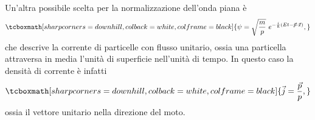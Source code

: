 \documentclass[a4paper,12pt,oneside]{book}
\begin{document}
Un'altra possibile scelta per la normalizzazione dell'onda piana è
	\begin{equation}
		\tcboxmath[sharp corners=downhill, colback=white, colframe=black]{	
			\psi  = \sqrt{\frac{m}{p}}\ e^{-\frac{i}{\hbar} (Et - \vec{p}\cdot \vec{x})},
			}
	\end{equation}
che descrive la corrente di particelle con flusso unitario, ossia una particella attraversa in media l'unità di superficie nell'unità di tempo. In questo caso la densità di corrente è infatti
	\begin{equation}
		\tcboxmath[sharp corners=downhill, colback=white, colframe=black]{
			\vec{j}=  \frac{\vec{p}}{p},
			}
	\end{equation}
ossia il vettore unitario nella direzione del moto.
\end{document}
